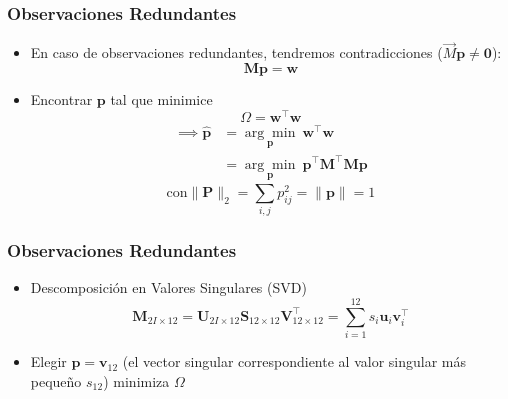 \begin{frame}
    \frametitle{Observaciones Redundantes}
    \begin{itemize}
        \item En caso de observaciones redundantes, tendremos contradicciones ($\vec{M}\mathbf{p} \neq \mathbf{0}$):
        \begin{equation*}
            \mathbf{M} \mathbf{p} = \mathbf{w}
        \end{equation*}
        \item Encontrar $\mathbf{p}$ tal que minimice
        \begin{equation*}
            \Omega = \mathbf{w}^{\top} \mathbf{w}
        \end{equation*}
        \begin{align*}
            \implies \mathbf{\hat{p}} &= \underset{\mathbf{p}}{\arg\min} \ \mathbf{w}^{\top} \mathbf{w}\\
            &= \underset{\mathbf{p}}{\arg\min} \ \mathbf{p}^{\top} \mathbf{M}^{\top} \mathbf{M} \mathbf{p}
        \end{align*}
        \begin{equation*}
          \text{con} \lVert\mathbf{P}\rVert_2 = \sum_{i,j} p_{ij}^2 = \lVert\mathbf{p}\rVert = 1
        \end{equation*}
    \end{itemize}
\end{frame}


\begin{frame}
    \frametitle{Observaciones Redundantes}
    \begin{itemize}
        \item Descomposición en Valores Singulares (SVD)
        \[
            \mathbf{M}_{2I \times 12} = \mathbf{U}_{2I \times 12} \mathbf{S}_{12 \times 12} \mathbf{V}_{12 \times 12}^{\top} = \sum_{i=1}^{12} s_i \mathbf{u}_i \mathbf{v}_i^{\top}
        \]
        \item Elegir $\mathbf{p} = \mathbf{v}_{12}$ (el vector singular correspondiente al valor singular más pequeño $s_{12}$) minimiza $\Omega$
    \end{itemize}
\end{frame}


